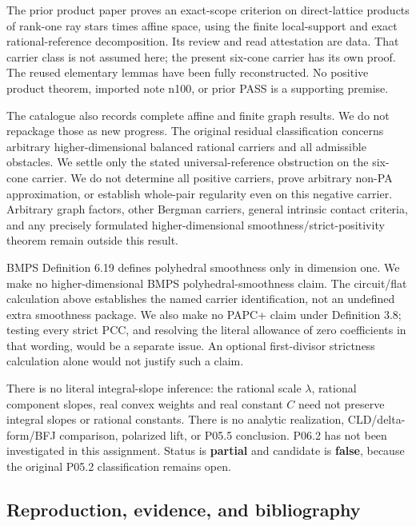 \documentclass[
  10pt,
]{article}
\begin{document}
The prior product paper proves an exact-scope criterion on
direct-lattice products of rank-one ray stars times affine space, using
the finite local-support and exact rational-reference decomposition. Its
review and read attestation are data. That carrier class is not assumed
here; the present six-cone carrier has its own proof. The reused
elementary lemmas have been fully reconstructed. No positive product
theorem, imported note n100, or prior PASS is a supporting premise.

The catalogue also records complete affine and finite graph results. We
do not repackage those as new progress. The original residual
classification concerns arbitrary higher-dimensional balanced rational
carriers and all admissible obstacles. We settle only the stated
universal-reference obstruction on the six-cone carrier. We do not
determine all positive carriers, prove arbitrary non-PA approximation,
or establish whole-pair regularity even on this negative carrier.
Arbitrary graph factors, other Bergman carriers, general intrinsic
contact criteria, and any precisely formulated higher-dimensional
smoothness/strict-positivity theorem remain outside this result.

BMPS Definition 6.19 defines polyhedral smoothness only in dimension
one. We make no higher-dimensional BMPS polyhedral-smoothness claim. The
circuit/flat calculation above establishes the named carrier
identification, not an undefined extra smoothness package. We also make
no PAPC+ claim under Definition 3.8; testing every strict PCC, and
resolving the literal allowance of zero coefficients in that wording,
would be a separate issue. An optional first-divisor strictness
calculation alone would not justify such a claim.

There is no literal integral-slope inference: the rational scale
\(\lambda\), rational component slopes, real convex weights and real
constant \(C\) need not preserve integral slopes or rational constants.
There is no analytic realization, CLD/delta-form/BFJ comparison,
polarized lift, or P05.5 conclusion. P06.2 has not been investigated in
this assignment. Status is \textbf{partial} and candidate is
\textbf{false}, because the original P05.2 classification remains open.

\subsection{Reproduction, evidence, and
bibliography}\label{reproduction-evidence-and-bibliography}
\end{document}
